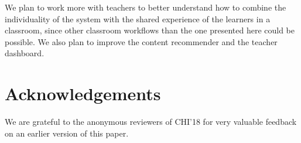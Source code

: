 We plan to work more with teachers to better understand how to combine the individuality of the system with the shared experience of the learners in a classroom, since other classroom workflows than the one presented here could be possible. We also plan to improve the content recommender and the teacher dashboard. 



\section{Acknowledgements}
We are grateful to the anonymous reviewers of CHI'18 for very valuable feedback on an earlier version of this paper. 
